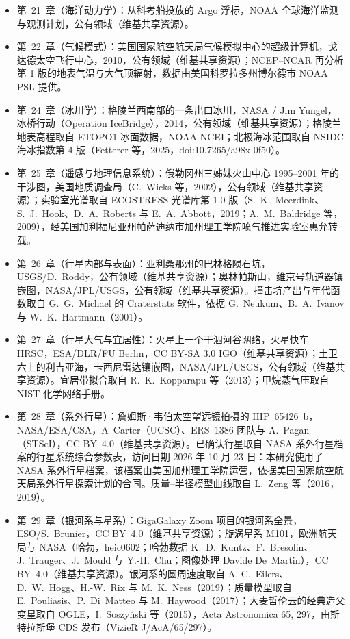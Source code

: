 \begin{itemize}
  \item 第~21~章（海洋动力学）：从科考船投放的 Argo 浮标，NOAA 全球海洋监测与观测计划，公有领域（维基共享资源）。
  \item 第~22~章（气候模式）：美国国家航空航天局气候模拟中心的超级计算机，戈达德太空飞行中心，2010，公有领域（维基共享资源）；NCEP--NCAR 再分析第 1 版的地表气温与大气顶辐射，数据由美国科罗拉多州博尔德市 NOAA PSL 提供。
  \item 第~24~章（冰川学）：格陵兰西南部的一条出口冰川，NASA / Jim Yungel，冰桥行动（Operation IceBridge），2014，公有领域（维基共享资源）；格陵兰地表高程取自 ETOPO1 冰面数据，NOAA NCEI；北极海冰范围取自 NSIDC 海冰指数第 4 版（Fetterer 等，2025，doi:10.7265/a98x-0f50）。
  \item 第~25~章（遥感与地理信息系统）：俄勒冈州三姊妹火山中心 1995--2001 年的干涉图，美国地质调查局（C.~Wicks 等，2002），公有领域（维基共享资源）；实验室光谱取自 ECOSTRESS 光谱库第 1.0 版（S.~K.~Meerdink、S.~J.~Hook、D.~A.~Roberts 与 E.~A.~Abbott，2019；A.~M.~Baldridge 等，2009），经美国加利福尼亚州帕萨迪纳市加州理工学院喷气推进实验室惠允转载。
  \item 第~26~章（行星内部与表面）：亚利桑那州的巴林格陨石坑，USGS/D.~Roddy，公有领域（维基共享资源）；奥林帕斯山，维京号轨道器镶嵌图，NASA/JPL/USGS，公有领域（维基共享资源）。撞击坑产出与年代函数取自 G.~G.~Michael 的 Craterstats 软件，依据 G.~Neukum、B.~A.~Ivanov 与 W.~K.~Hartmann（2001）。
  \item 第~27~章（行星大气与宜居性）：火星上一个干涸河谷网络，火星快车 HRSC，ESA/DLR/FU Berlin，CC BY-SA 3.0 IGO（维基共享资源）；土卫六上的利吉亚海，卡西尼雷达镶嵌图，NASA/JPL/USGS，公有领域（维基共享资源）。宜居带拟合取自 R.~K.~Kopparapu 等（2013）；甲烷蒸气压取自 NIST 化学网络手册。
  \item 第~28~章（系外行星）：詹姆斯·韦伯太空望远镜拍摄的 HIP~65426~b，NASA/ESA/CSA，A~Carter（UCSC）、ERS~1386 团队与 A.~Pagan（STScI），CC BY~4.0（维基共享资源）。已确认行星取自 NASA 系外行星档案的行星系统综合参数表，访问日期 2026 年 10 月 23 日：本研究使用了 NASA 系外行星档案，该档案由美国加州理工学院运营，依据美国国家航空航天局系外行星探索计划的合同。质量--半径模型曲线取自 L.~Zeng 等（2016，2019）。
  \item 第~29~章（银河系与星系）：GigaGalaxy Zoom 项目的银河系全景，ESO/S.~Brunier，CC BY~4.0（维基共享资源）；旋涡星系 M101，欧洲航天局与 NASA（哈勃，heic0602；哈勃数据 K.~D.~Kuntz、F.~Bresolin、J.~Trauger、J.~Mould 与 Y.-H.~Chu；图像处理 Davide De~Martin），CC BY~4.0（维基共享资源）。银河系的圆周速度取自 A.-C.~Eilers、D.~W.~Hogg、H.-W.~Rix 与 M.~K.~Ness（2019）；质量模型取自 E.~Pouliasis、P.~Di~Matteo 与 M.~Haywood（2017）；大麦哲伦云的经典造父变星取自 OGLE，I.~Soszy\'nski 等（2015），Acta Astronomica 65, 297，由斯特拉斯堡 CDS 发布（VizieR J/AcA/65/297）。

\end{itemize}
